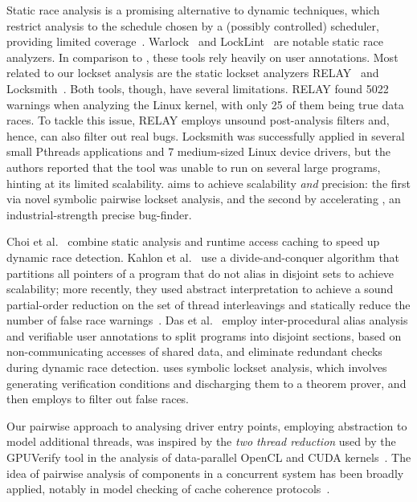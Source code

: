 Static race analysis is a promising alternative to dynamic techniques, which restrict analysis to the schedule chosen by a (possibly controlled) scheduler, providing limited coverage~\cite{musuvathi2008finding}. Warlock~\cite{sterling1993warlock} and LockLint~\cite{oracle2010locklint} are notable static race analyzers.  In comparison to \whoop, these tools rely heavily on user annotations.
%
Most related to our lockset analysis are the static lockset analyzers RELAY~\cite{voung2007relay} and Locksmith~\cite{pratikakis2006locksmith}. Both tools, though, have several limitations. RELAY found 5022 warnings when analyzing the Linux kernel, with only 25 of them being true data races. To tackle this issue, RELAY employs unsound post-analysis filters and, hence, can also filter out real bugs. Locksmith was successfully applied in several small Pthreads applications and 7 medium-sized Linux device drivers, but the authors reported that the tool was unable to run on several large programs, hinting at its limited scalability. \whoop aims to achieve scalability \emph{and} precision: the first via novel symbolic pairwise lockset analysis, and the second by accelerating \corral, an industrial-strength precise bug-finder.

 Choi et al.~\cite{choi2002efficient} combine static analysis and runtime access caching to speed up dynamic race detection. Kahlon et al.~\cite{kahlon2007fast} use a divide-and-conquer algorithm that partitions all pointers of a program that do not alias in disjoint sets to achieve scalability; more recently, they used abstract interpretation to achieve a sound partial-order reduction on the set of thread interleavings and statically reduce the number of false race warnings~\cite{kahlon2009semantic}. Das et al.~\cite{das2015section} employ inter-procedural alias analysis and verifiable user annotations to split programs into disjoint sections, based on non-communicating accesses of shared data, and eliminate redundant checks during dynamic race detection. \whoop uses symbolic lockset analysis, which involves generating verification conditions and discharging them to a theorem prover, and then employs \corral to filter out false races. 

Our pairwise approach to analysing driver entry points, employing abstraction to model additional threads, was inspired by the \emph{two thread reduction} used by the GPUVerify tool in the analysis of data-parallel OpenCL and CUDA kernels~\cite{gpuverify,bardsley2014engineering}.  The idea of pairwise analysis of components in a concurrent system has been broadly applied, notably in model checking of cache coherence protocols~\cite{mcmillan1999verification}.
